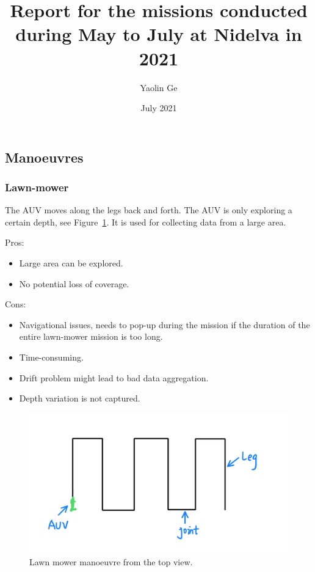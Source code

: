 \documentclass[a4paper,12pt]{report}
\title{Report for the missions conducted during May to July at Nidelva in 2021}
\author{Yaolin Ge}
\date{July 2021}
\begin{document}
\maketitle

\subsection*{Manoeuvres}
\subsubsection*{Lawn-mower}
The AUV moves along the legs back and forth. The AUV is only exploring a certain depth, see Figure~\ref{fig:lawn_mower}. It is used for collecting data from a large area. 

Pros:
\begin{itemize}
    \item Large area can be explored.
    \item No potential loss of coverage. 
\end{itemize}

Cons:
\begin{itemize}
    \item Navigational issues, needs to pop-up during the mission if the duration of the entire lawn-mower mission is too long. 
    \item Time-consuming.
    \item Drift problem might lead to bad data aggregation.
    \item Depth variation is not captured.
\end{itemize}


\begin{figure}
    \centering
    \includegraphics[width = \textwidth]{fig/lawn_mower.png}
    \caption{Lawn mower manoeuvre from the top view.}
    \label{fig:lawn_mower}
\end{figure}
\end{document}
